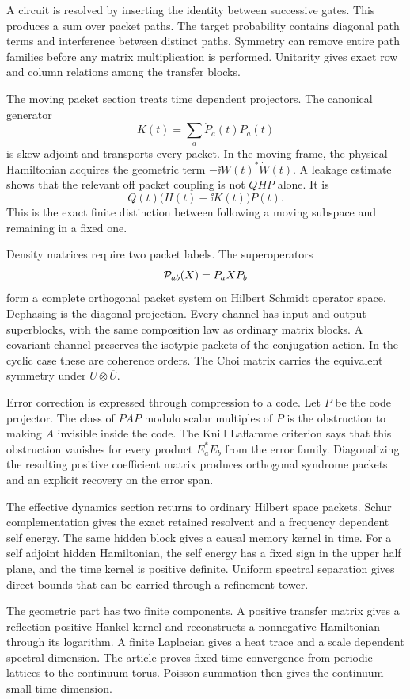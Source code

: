 A circuit is resolved by inserting the identity between successive gates. This produces a sum over packet paths. The target probability contains diagonal path terms and interference between distinct paths. Symmetry can remove entire path families before any matrix multiplication is performed. Unitarity gives exact row and column relations among the transfer blocks.

The moving packet section treats time dependent projectors. The canonical generator
\[
K(t)=\sum_a\dot P_a(t)P_a(t)
\]
is skew adjoint and transports every packet. In the moving frame, the physical Hamiltonian acquires the geometric term \(-\ii W(t)^*\dot W(t)\). A leakage estimate shows that the relevant off packet coupling is not \(QHP\) alone. It is
\[
Q(t)\bigl(H(t)-\ii K(t)\bigr)P(t).
\]
This is the exact finite distinction between following a moving subspace and remaining in a fixed one.

Density matrices require two packet labels. The superoperators
\[
\mathcal P_{ab}(X)=P_aXP_b
\]
form a complete orthogonal packet system on Hilbert Schmidt operator space. Dephasing is the diagonal projection. Every channel has input and output superblocks, with the same composition law as ordinary matrix blocks. A covariant channel preserves the isotypic packets of the conjugation action. In the cyclic case these are coherence orders. The Choi matrix carries the equivalent symmetry under \(U\otimes\overline U\).

Error correction is expressed through compression to a code. Let \(P\) be the code projector. The class of \(PAP\) modulo scalar multiples of \(P\) is the obstruction to making \(A\) invisible inside the code. The Knill Laflamme criterion says that this obstruction vanishes for every product \(E_a^*E_b\) from the error family. Diagonalizing the resulting positive coefficient matrix produces orthogonal syndrome packets and an explicit recovery on the error span.

The effective dynamics section returns to ordinary Hilbert space packets. Schur complementation gives the exact retained resolvent and a frequency dependent self energy. The same hidden block gives a causal memory kernel in time. For a self adjoint hidden Hamiltonian, the self energy has a fixed sign in the upper half plane, and the time kernel is positive definite. Uniform spectral separation gives direct bounds that can be carried through a refinement tower.

The geometric part has two finite components. A positive transfer matrix gives a reflection positive Hankel kernel and reconstructs a nonnegative Hamiltonian through its logarithm. A finite Laplacian gives a heat trace and a scale dependent spectral dimension. The article proves fixed time convergence from periodic lattices to the continuum torus. Poisson summation then gives the continuum small time dimension.

